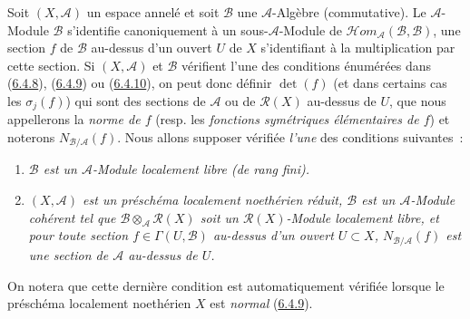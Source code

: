 \begin{env}[6.5.1]
\label{II.6.5.1-fr}
Soit $(X,\mathcal{A})$ un espace annelé et soit $\mathcal{B}$ une
$\mathcal{A}$-Algèbre (commutative). Le $\mathcal{A}$-Module $\mathcal{B}$
s'identifie canoniquement à un sous-$\mathcal{A}$-Module de
$\mathcal{H}om_{\mathcal{A}}(\mathcal{B},\mathcal{B})$, une section $f$ de
$\mathcal{B}$ au-dessus d'un ouvert $U$ de $X$ s'identifiant à la
multiplication par cette section. Si $(X,\mathcal{A})$ et $\mathcal{B}$
vérifient l'une des conditions énumérées dans
(\hyperref[II.6.4.8-fr]{6.4.8}), (\hyperref[II.6.4.9-fr]{6.4.9}) ou
(\hyperref[II.6.4.10-fr]{6.4.10}), on peut donc définir $\det(f)$ (et dans
certains cas les $\sigma_j(f)$) qui sont des sections de $\mathcal{A}$ ou de
$\mathcal{R}(X)$ au-dessus de $U$, que nous appellerons la \emph{norme de
$f$} (resp. les \emph{fonctions symétriques élémentaires de $f$}) et noterons
$N_{\mathcal{B}/\mathcal{A}}(f)$. Nous allons supposer vérifiée \emph{l'une}
des conditions suivantes~:
\begin{enumerate}
\item[(I)] \emph{$\mathcal{B}$ est un $\mathcal{A}$-Module localement libre
(de rang fini).}
\item[(II)] \emph{$(X,\mathcal{A})$ est un préschéma localement noethérien
réduit, $\mathcal{B}$ est un $\mathcal{A}$-Module cohérent tel que
$\mathcal{B}\otimes_{\mathcal{A}}\mathcal{R}(X)$ soit un
$\mathcal{R}(X)$-Module localement libre, et pour toute section
$f\in\Gamma(U,\mathcal{B})$ au-dessus d'un ouvert $U\subset X$,
$N_{\mathcal{B}/\mathcal{A}}(f)$ est une section de $\mathcal{A}$ au-dessus
de $U$.}
\end{enumerate}


On notera que cette dernière condition est automatiquement vérifiée lorsque
le préschéma localement noethérien $X$ est \emph{normal}
(\hyperref[II.6.4.9-fr]{6.4.9}).


\end{env}
